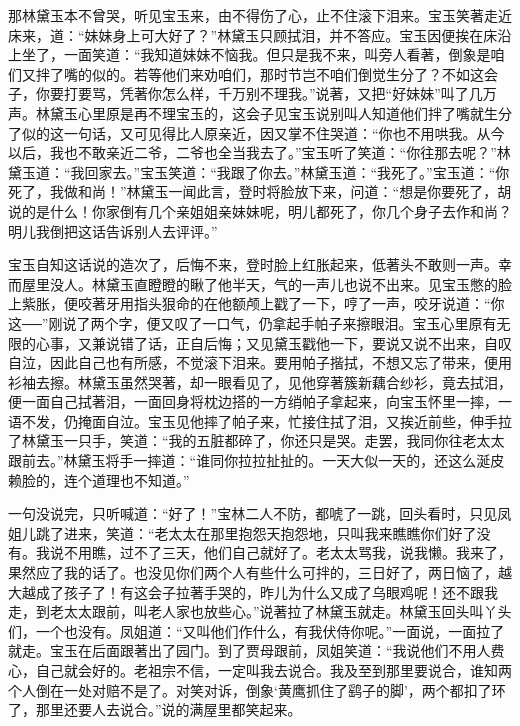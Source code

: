 \begin{parag}
    那林黛玉本不曾哭，听见宝玉来，由不得伤了心，止不住滚下泪来。宝玉笑著走近床来，道：“妹妹身上可大好了？”林黛玉只顾拭泪，并不答应。宝玉因便挨在床沿上坐了，一面笑道：“我知道妹妹不恼我。但只是我不来，叫旁人看著，倒象是咱们又拌了嘴的似的。若等他们来劝咱们，那时节岂不咱们倒觉生分了？不如这会子，你要打要骂，凭著你怎么样，千万别不理我。”说著，又把“好妹妹”叫了几万声。林黛玉心里原是再不理宝玉的，这会子见宝玉说别叫人知道他们拌了嘴就生分了似的这一句话，又可见得比人原亲近，因又掌不住哭道：“你也不用哄我。从今以后，我也不敢亲近二爷，二爷也全当我去了。”宝玉听了笑道：“你往那去呢？”林黛玉道：“我回家去。”宝玉笑道：“我跟了你去。”林黛玉道：“我死了。”宝玉道：“你死了，我做和尚！”林黛玉一闻此言，登时将脸放下来，问道：“想是你要死了，胡说的是什么！你家倒有几个亲姐姐亲妹妹呢，明儿都死了，你几个身子去作和尚？明儿我倒把这话告诉别人去评评。”
\end{parag}


\begin{parag}
    宝玉自知这话说的造次了，后悔不来，登时脸上红胀起来，低著头不敢则一声。幸而屋里没人。林黛玉直瞪瞪的瞅了他半天，气的一声儿也说不出来。见宝玉憋的脸上紫胀，便咬著牙用指头狠命的在他额颅上戳了一下，哼了一声，咬牙说道：“你这──”刚说了两个字，便又叹了一口气，仍拿起手帕子来擦眼泪。宝玉心里原有无限的心事，又兼说错了话，正自后悔；又见黛玉戳他一下，要说又说不出来，自叹自泣，因此自己也有所感，不觉滚下泪来。要用帕子揩拭，不想又忘了带来，便用衫袖去擦。林黛玉虽然哭著，却一眼看见了，见他穿著簇新藕合纱衫，竟去拭泪，便一面自己拭著泪，一面回身将枕边搭的一方绡帕子拿起来，向宝玉怀里一摔，一语不发，仍掩面自泣。宝玉见他摔了帕子来，忙接住拭了泪，又挨近前些，伸手拉了林黛玉一只手，笑道：“我的五脏都碎了，你还只是哭。走罢，我同你往老太太跟前去。”林黛玉将手一摔道：“谁同你拉拉扯扯的。一天大似一天的，还这么涎皮赖脸的，连个道理也不知道。”
\end{parag}


\begin{parag}
    一句没说完，只听喊道：“好了！”宝林二人不防，都唬了一跳，回头看时，只见凤姐儿跳了进来，笑道：“老太太在那里抱怨天抱怨地，只叫我来瞧瞧你们好了没有。我说不用瞧，过不了三天，他们自己就好了。老太太骂我，说我懒。我来了，果然应了我的话了。也没见你们两个人有些什么可拌的，三日好了，两日恼了，越大越成了孩子了！有这会子拉著手哭的，昨儿为什么又成了乌眼鸡呢！还不跟我走，到老太太跟前，叫老人家也放些心。”说著拉了林黛玉就走。林黛玉回头叫丫头们，一个也没有。凤姐道：“又叫他们作什么，有我伏侍你呢。”一面说，一面拉了就走。宝玉在后面跟著出了园门。到了贾母跟前，凤姐笑道：“我说他们不用人费心，自己就会好的。老祖宗不信，一定叫我去说合。我及至到那里要说合，谁知两个人倒在一处对赔不是了。对笑对诉，倒象‘黄鹰抓住了鹞子的脚’，两个都扣了环了，那里还要人去说合。”说的满屋里都笑起来。
\end{parag}


